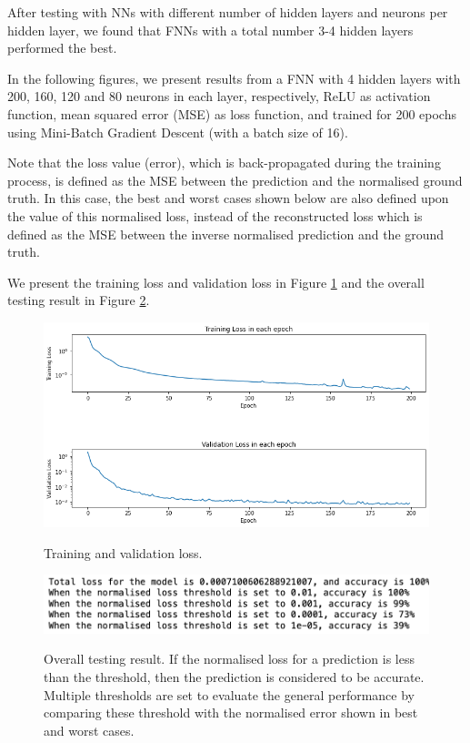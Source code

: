 After testing with NNs with different number of hidden layers and neurons per hidden layer, we found that FNNs with a total number 3-4 hidden layers performed the best.

In the following figures, we present results from a FNN with 4 hidden layers with 200, 160, 120 and 80 neurons in each layer, respectively, ReLU as activation function, mean squared error (MSE) as loss function, and trained for 200 epochs using Mini-Batch Gradient Descent (with a batch size of 16).

Note that the loss value (error), which is back-propagated during the training process, is defined as the MSE between the prediction and the normalised ground truth. In this case, the best and worst cases shown below are also defined upon the value of this normalised loss, instead of the reconstructed loss which is defined as the MSE between the inverse normalised prediction and the ground truth.

We present the training loss and validation loss in Figure \ref{figure:geoid_losses} and the overall testing result in Figure \ref{figure:geoid_testing}.

\begin{figure}[H]
    \caption{Training and validation loss.}
    \includegraphics[scale=0.6]{figures/geoid_images/Geoid_trainingData.png}
    \label{figure:geoid_losses}
\end{figure}

\begin{figure}[H]
    \caption{Overall testing result. If the normalised loss for a prediction is less than the threshold, then the prediction is considered to be accurate. Multiple thresholds are set to evaluate the general performance by comparing these threshold with the normalised error shown in best and worst cases.}
    \includegraphics[scale=0.8]{figures/geoid_images/Geoid_OverallTesting.png}
    \label{figure:geoid_testing}
\end{figure}

